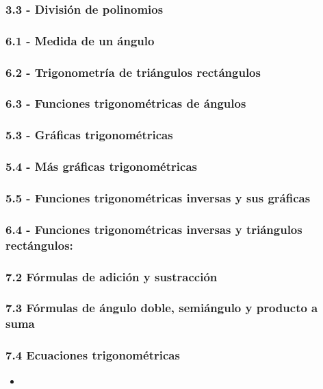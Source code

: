 \subsubsection{3.3 - División de polinomios}
\subsubsection{6.1 - Medida de un ángulo}
\subsubsection{6.2 - Trigonometría de triángulos rectángulos}
\subsubsection{6.3 - Funciones trigonométricas de ángulos}
\subsubsection{5.3 - Gráficas trigonométricas}
\subsubsection{5.4 - Más gráficas trigonométricas}
\subsubsection{5.5 - Funciones trigonométricas inversas y sus gráficas}
\subsubsection{6.4 - Funciones trigonométricas inversas y triángulos rectángulos:}
\subsubsection{7.2 Fórmulas de adición y sustracción}
\subsubsection{7.3 Fórmulas de ángulo doble, semiángulo y producto a suma}
\subsubsection{7.4 Ecuaciones trigonométricas}



\begin{itemize}
	\item 
\end{itemize}